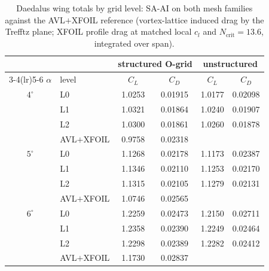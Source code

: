 \documentclass[journal]{new-aiaa}
\begin{document}
\begin{table}[tp]
  \centering
  \small
  \caption{Daedalus wing totals by grid level: SA-AI on both mesh
  families against the AVL$+$XFOIL reference (vortex-lattice induced drag by the
  Trefftz plane; XFOIL profile drag at matched local $c_l$ and
  $N_\mathrm{crit}\!=\!13.6$, integrated over span).}
  \label{tab:daetotals}
  \begin{tabular}{cl cc cc}
    \toprule
    & & \multicolumn{2}{c}{structured O-grid} & \multicolumn{2}{c}{unstructured}\\
    \cmidrule(lr){3-4}\cmidrule(lr){5-6}
    $\alpha$ & level & $C_L$ & $C_D$ & $C_L$ & $C_D$\\
    \midrule
    $4^\circ$ & L0 & 1.0253 & 0.01915 & 1.0177 & 0.02098\\
              & L1 & 1.0321 & 0.01864 & 1.0240 & 0.01907\\
              & L2 & 1.0300 & 0.01861 & 1.0260 & 0.01878\\
              & AVL$+$XFOIL & 0.9758 & 0.02318 & &\\
    \midrule
    $5^\circ$ & L0 & 1.1268 & 0.02178 & 1.1173 & 0.02387\\
              & L1 & 1.1346 & 0.02110 & 1.1253 & 0.02170\\
              & L2 & 1.1315 & 0.02105 & 1.1279 & 0.02131\\
              & AVL$+$XFOIL & 1.0746 & 0.02565 & &\\
    \midrule
    $6^\circ$ & L0 & 1.2259 & 0.02473 & 1.2150 & 0.02711\\
              & L1 & 1.2358 & 0.02390 & 1.2249 & 0.02464\\
              & L2 & 1.2298 & 0.02389 & 1.2282 & 0.02412\\
              & AVL$+$XFOIL & 1.1730 & 0.02837 & &\\
    \bottomrule
  \end{tabular}
\end{table}
\end{document}
